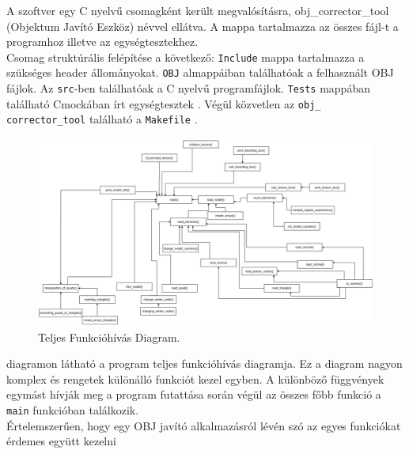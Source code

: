 A szoftver egy C nyelvű csomagként került megvalósításra, obj\_corrector\_tool (Objektum Javító Eszköz) névvel ellátva. A mappa tartalmazza az összes fájl-t a programhoz illetve az egységtesztekhez.\\

Csomag struktúrális felépítése a következő:
\bigskip
{}
\newpage
\texttt{Include} mappa tartalmazza a szükséges header állományokat.  \texttt{OBJ} almappáiban találhatóak a felhasznált OBJ fájlok. Az \texttt{src}-ben találhatóak a C nyelvű programfájlok. \texttt{Tests} mappában található Cmockában írt egységtesztek . Végül közvetlen az \texttt{obj\_\\corrector\_tool} található a \texttt{Makefile} .\\

\begin{figure}[h]
\centering
\includegraphics[width=\textwidth]{images/func.png}
\caption{Teljes Funkcióhívás Diagram.}
\label{fig:funk}
\end{figure}

 diagramon látható a program teljes funkcióhívás diagramja. Ez a diagram nagyon komplex és rengetek különálló funkciót kezel egyben. A különböző függvények egymást hívják meg a program futattása során végül az összes főbb funkció a \texttt{main} funkcióban találkozik.\\

Értelemszerűen, hogy egy OBJ javító alkalmazásról lévén szó az egyes funkciókat érdemes együtt  kezelni\\

